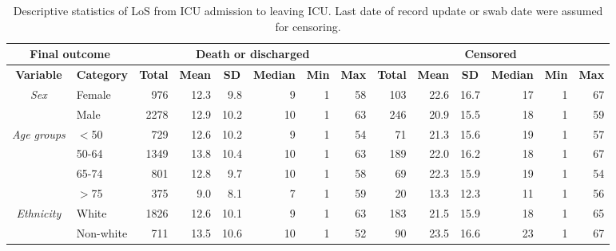 \documentclass[review]{elsarticle}
\begin{document}
\begin{landscape}
\begin{table}[htb]
  \centering\small
  \caption{Descriptive statistics of LoS from ICU admission to leaving ICU. Last date of record update or swab date were assumed for censoring.}
  \renewcommand{\arraystretch}{0.9}
    \begin{tabular}{cc|rrrrrr|rrrrrr}
    \toprule
    \multicolumn{2}{c|}{\textbf{Final outcome}} & \multicolumn{6}{c|}{\textbf{Death or discharged}} & \multicolumn{6}{c}{\textbf{Censored}} \\
    \midrule
    \textbf{Variable} & \textbf{Category} & \multicolumn{1}{c}{\textbf{Total}} & \multicolumn{1}{c}{\textbf{Mean}} & \multicolumn{1}{c}{\textbf{SD}} & \multicolumn{1}{c}{\textbf{Median}} & \multicolumn{1}{c}{\textbf{Min}} & \multicolumn{1}{c|}{\textbf{Max}} & \multicolumn{1}{c}{\textbf{Total}} & \multicolumn{1}{c}{\textbf{Mean}} & \multicolumn{1}{c}{\textbf{SD}} & \multicolumn{1}{c}{\textbf{Median}} & \multicolumn{1}{c}{\textbf{Min}} & \multicolumn{1}{c}{\textbf{Max}} \\
    \midrule
    \multicolumn{1}{c}{\multirow{2}{0.11\textwidth}{\textit{Sex}}} & \multicolumn{1}{l|}{Female} & 976   & 12.3  & 9.8   & 9     & 1     & 58    & 103   & 22.6  & 16.7  & 17    & 1     & 67 \\
          & \multicolumn{1}{l|}{Male} & 2278  & 12.9  & 10.2  & 10    & 1     & 63    & 246   & 20.9  & 15.5  & 18    & 1     & 59 \\
    \midrule
    \multicolumn{1}{c}{\multirow{4}[t]{0.11\textwidth}{\textit{Age groups}}} & \multicolumn{1}{l|}{$<$50} & 729   & 12.6  & 10.2  & 9     & 1     & 54    & 71    & 21.3  & 15.6  & 19    & 1     & 57 \\
          & \multicolumn{1}{l|}{50-64} & 1349  & 13.8  & 10.4  & 10    & 1     & 63    & 189   & 22.0  & 16.2  & 18    & 1     & 67 \\
          & \multicolumn{1}{l|}{65-74} & 801   & 12.8  & 9.7   & 10    & 1     & 58    & 69    & 22.3  & 15.9  & 19    & 1     & 54 \\
          & \multicolumn{1}{l|}{$>$75} & 375   & 9.0   & 8.1   & 7     & 1     & 59    & 20    & 13.3  & 12.3  & 11    & 1     & 56 \\
    \midrule
    \multicolumn{1}{c}{\multirow{3}[2]{0.11\textwidth}{\textit{Ethnicity}}} & \multicolumn{1}{l|}{White} & 1826  & 12.6  & 10.1  & 9     & 1     & 63    & 183   & 21.5  & 15.9  & 18    & 1     & 65 \\
          & \multicolumn{1}{l|}{Non-white} & 711   & 13.5  & 10.6  & 10    & 1     & 52    & 90    & 23.5  & 16.6  & 23    & 1     & 67 \\

\end{tabular}
\end{table}
\end{landscape}
\end{document}
